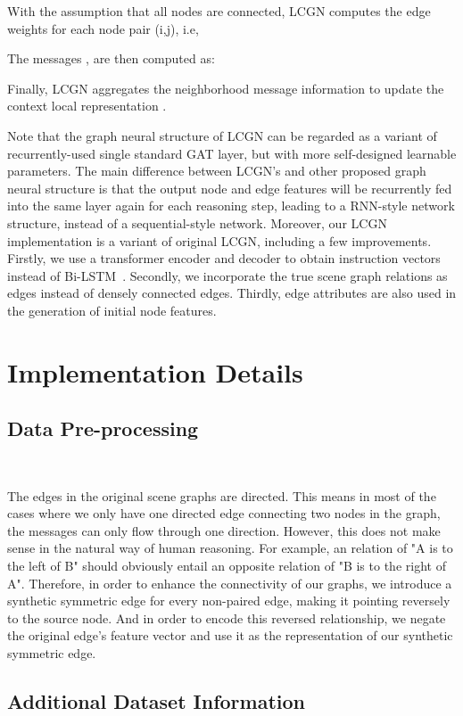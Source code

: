 \documentclass[11pt]{article}
\begin{document}
With the assumption that all nodes are connected, LCGN  computes the edge weights for each node pair (i,j), i.e, 

The messages , are then computed as:

Finally, LCGN aggregates the neighborhood message information to update the context local representation .

Note that the graph neural structure of LCGN can be regarded as a variant of recurrently-used single standard GAT layer, but with more self-designed learnable parameters. The main difference between LCGN's and other proposed graph neural structure is that the output node and edge features will be recurrently fed into the same layer again for each reasoning step, leading to
a RNN-style network structure, instead of a sequential-style network. Moreover, our LCGN implementation is a variant of original LCGN, including a few improvements. Firstly, we use a transformer encoder and decoder to obtain instruction vectors instead of Bi-LSTM~\cite{DBLP:conf/acl/LiangZY20}. Secondly, we incorporate the true scene graph relations as edges instead of densely connected edges. Thirdly, edge attributes are also used in the generation of initial node features.

 
\section{Implementation Details}
\label{sec:Addi}


\subsection{Data Pre-processing}
~\label{subsec:Pre-processing}

The edges in the original scene graphs are directed. This means in most of the cases where we only have one directed edge connecting two nodes in the graph, the messages can only flow through one direction. However, this does not make sense in the natural way of human reasoning. For example, an relation of "A is to the left of B" should obviously entail an opposite relation of "B is to the right of A". Therefore, in order to enhance the connectivity of our graphs, we introduce a synthetic symmetric edge for every non-paired edge, making it pointing reversely to the source node. And in order to encode this reversed relationship, we  negate the original edge's feature vector and use it as the representation of our synthetic symmetric edge.
\subsection{Additional Dataset Information}
\end{document}
